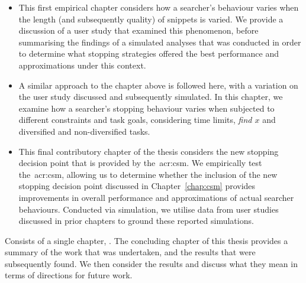 \begin{itemize}
    \item[]{ This first empirical chapter considers how a searcher's behaviour varies when the length (and subsequently quality) of snippets is varied. We provide a discussion of a user study that examined this phenomenon, before summarising the findings of a simulated analyses that was conducted in order to determine what stopping strategies offered the best performance and approximations under this context.}
    \item[]{ A similar approach to the chapter above is followed here, with a variation on the user study discussed and subsequently simulated. In this chapter, we examine how a searcher's stopping behaviour varies when subjected to different constraints and task goals, considering time limits, \emph{find $x$} and diversified and non-diversified tasks.}
    \item[]{ This final contributory chapter of the thesis considers the new stopping decision point that is provided by the~\gls{acr:csm}. We empirically test the~\gls{acr:csm}, allowing us to determine whether the inclusion of the new stopping decision point discussed in Chapter~\ref{chap:csm} provides improvements in overall performance and approximations of actual searcher behaviours. Conducted via simulation, we utilise data from user studies discussed in prior chapters to ground these reported simulations.}
\end{itemize}

\noindent
{} Consists of a single chapter, . The concluding chapter of this thesis provides a summary of the work that was undertaken, and the results that were subsequently found. We then consider the results and discuss what they mean in terms of directions for future work.





